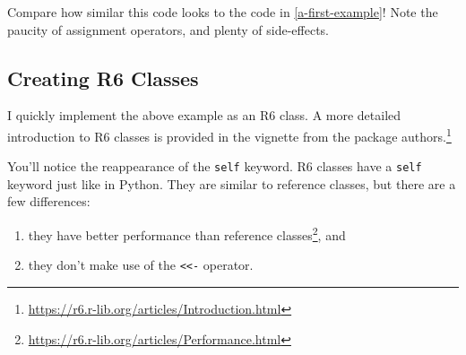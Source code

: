 \documentclass[
  12pt,
  krantz2]{krantz}
\providecommand{\tightlist}{%
  \setlength{\itemsep}{0pt}\setlength{\parskip}{0pt}}
\renewcommand{\href}[2]{#2\footnote{\url{#1}}}
\begin{document}
Compare how similar this code looks to the code in \ref{a-first-example}! Note the paucity of assignment operators, and plenty of side-effects.

\hypertarget{creating-r6-classes}{%
\subsection{Creating R6 Classes}\label{creating-r6-classes}}

I quickly implement the above example as an R6 class. A more detailed introduction to R6 classes is provided in \href{https://r6.r-lib.org/articles/Introduction.html}{the vignette from the package authors.}

You'll notice the reappearance of the \texttt{self} keyword. R6 classes have a \texttt{self} keyword just like in Python. They are similar to reference classes, but there are a few differences:

\begin{enumerate}
\def\labelenumi{\arabic{enumi}.}
\tightlist
\item
  they have \href{https://r6.r-lib.org/articles/Performance.html}{better performance than reference classes}, and
\item
  they don't make use of the \texttt{\textless{}\textless{}-} operator.
\end{enumerate}
\end{document}
